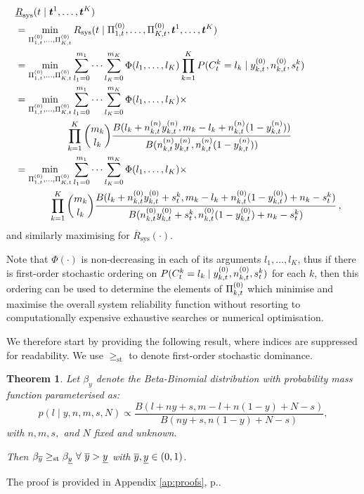 \documentclass[12pt, a4paper]{elsarticle}
\newtheorem{theorem}{Theorem}
\newcommand{\bs}[1]{\boldsymbol{#1}}
\renewcommand{\vec}[1]{{\bs#1}}
\newcommand{\ul}[1]{\underline{#1}}
\newcommand{\ol}[1]{\overline{#1}}
\newcommand{\Rsys}{R_\text{sys}}
\newcommand{\lRsys}{\ul{R}_\text{sys}}
\newcommand{\uRsys}{\ol{R}_\text{sys}}
\begin{document}
\begin{align}
\lefteqn{\lRsys(t \mid \vec{t}^1, \ldots, \vec{t}^K)} \nonumber \\
 &= \min_{\PtZi{1}, \ldots, \PtZi{K}} \Rsys(t \mid \PtZi{1}, \ldots, \PtZi{K}, \vec{t}^1, \ldots, \vec{t}^K) \nonumber \\
 &= \min_{\PtZi{1}, \ldots, \PtZi{K}} 
    \sum_{l_1=0}^{m_1} \cdots \sum_{l_K=0}^{m_K} \Phi(l_1, \ldots, l_K)
                                                 \prod_{k=1}^K P(C^k_t = l_k \mid \yktz, \nktz, s^k_t) \nonumber \\
 &= \min_{\PtZi{1}, \ldots, \PtZi{K}} 
    \sum_{l_1=0}^{m_1} \cdots \sum_{l_K=0}^{m_K} \Phi(l_1, \ldots, l_K) \times \nonumber \\ & \hspace*{12ex}
    \prod_{k=1}^K {m_k \choose l_k} \frac{B(l_k + \nn_{k,t}\yn_{k,t}, m_k - l_k + \nn_{k,t}(1-\yn_{k,t}))}
                                         {B(\nn_{k,t}\yn_{k,t}, \nn_{k,t}(1-\yn_{k,t}))} \nonumber \\
 &= \min_{\PtZi{1}, \ldots, \PtZi{K}} 
    \sum_{l_1=0}^{m_1} \cdots \sum_{l_K=0}^{m_K} \Phi(l_1, \ldots, l_K) \times \nonumber \\ & \hspace*{8ex}
    \prod_{k=1}^K {m_k \choose l_k} \frac{B(l_k + \nktz\yktz + s^k_t, m_k - l_k + \nktz(1-\yktz) + n_k - s^k_t)}{B(\nktz\yktz + s^k_t, \nktz(1-\yktz) + n_k - s^k_t)}
    \,, \label{eq:LwrSysPostA}
\end{align}
and similarly maximising for $\uRsys(\cdot)$.

Note that $\Phi(\cdot)$ is non-decreasing in each of its arguments $l_1,\ldots,l_K$,
thus if there is first-order stochastic ordering on $P(C^k_t = l_k \mid y^{(0)}_{k,t}, n^{(0)}_{k,t}, s^k_t)$
for each $k$, then this ordering can be used to determine the elements of $\Pi^{(0)}_{k,t}$
which minimise and maximise the overall system reliability function without
resorting to computationally expensive exhaustive searches or numerical optimisation.

We therefore start by providing the following result, where indices are suppressed for readability.
We use $\ge_{\mathrm{st}}$ to denote first-order stochastic dominance.

\begin{theorem}
  \label{thm:y}
  Let $\beta_y$ denote the Beta-Binomial distribution with probability mass function parameterised as:
  \[ p(l \mid y, n, m, s, N) \propto \frac{B(l + ny + s, m - l + n(1-y) + N - s)}{B(ny + s, n(1-y) + N - s)}, \]
  with $n, m, s,$ and $N$ fixed and unknown.
  
  Then $\beta_{\yu} \ge_{\mathrm{st}} \beta_{\yl} \ \forall \ \yu > \yl$ with $\yu, \yl \in (0,1)$.
\end{theorem}
The proof is provided in Appendix \ref{ap:proofs}, p.\pageref{prf:y}.
\end{document}
